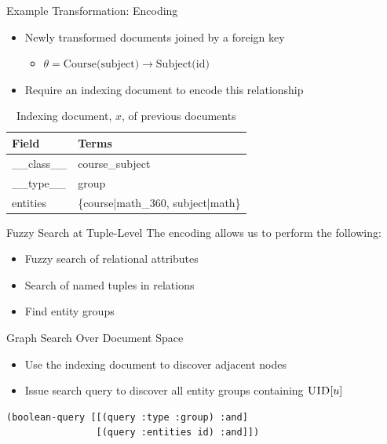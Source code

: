 \documentclass[compress]{beamer}
\newcommand{\prop}[2]{\ensuremath\textsc{#1}[#2]}
\newcommand{\uid}[1]{\prop{UID}{#1}}
\begin{document}
		\begin{frame}{Example Transformation:  Encoding}
			\begin{itemize}
				\item Newly transformed documents joined by a foreign key
					\begin{itemize}
						\item \(\theta = \text{Course(subject)} \rightarrow \text{Subject(id)}\)
					\end{itemize}
				\item Require an indexing document to encode this relationship
			\end{itemize}
			
			\begin{table}
				\begin{tabular}{ll}
					\toprule
					Field & Terms \\
					\midrule
					\_\_class\_\_ & course\_subject \\
					\_\_type\_\_ & group \\
					entities & \{course|math\_360, subject|math\} \\
					\bottomrule
				\end{tabular}
				
				\caption{Indexing document, \(x\), of previous documents}
			\end{table}
		\end{frame}
		
		\begin{frame}{Fuzzy Search at Tuple-Level}
			The encoding allows us to perform the following:
			
			\begin{itemize}
				\item Fuzzy search of relational attributes
				\item Search of named tuples in relations
				\item Find entity groups
			\end{itemize}
		\end{frame}
		
		\begin{frame}[fragile]{Graph Search Over Document Space}
			\begin{itemize}
				\item Use the indexing document to discover adjacent nodes
				\item Issue search query to discover all entity groups containing \(\uid{u}\)
			\end{itemize}
			
			\begin{verbatim}
(boolean-query [[(query :type :group) :and]
                [(query :entities id) :and]])
			\end{verbatim}
		\end{frame}
		
\end{document}
